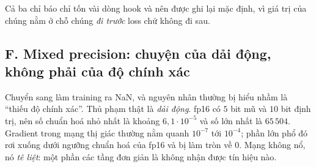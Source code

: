 \documentclass[../../../deep_learning.tex]{subfiles}
\begin{document}
Cả ba chỉ báo chỉ tốn vài dòng hook và nên được ghi lại mặc định, vì giá trị của chúng nằm ở chỗ chúng \emph{đi trước} loss chứ không đi sau.

\subsection{F. Mixed precision: chuyện của dải động, không phải của độ chính xác}
Chuyển sang  làm training ra NaN, và nguyên nhân thường bị hiểu nhầm là ``thiếu độ chính xác''. Thủ phạm thật là \emph{dải động}. fp16 có \(5\) bit mũ và \(10\) bit định trị, nên số chuẩn hoá nhỏ nhất là khoảng \(6{,}1\cdot 10^{-5}\) và số lớn nhất là \(65\,504\). Gradient trong mạng thị giác thường nằm quanh \(10^{-7}\) tới \(10^{-4}\); phần lớn phổ đó rơi xuống dưới ngưỡng chuẩn hoá của fp16 và bị làm tròn về \(0\). Mạng không nổ, nó \emph{tê liệt}: một phần các tầng đơn giản là không nhận được tín hiệu nào.
\end{document}
